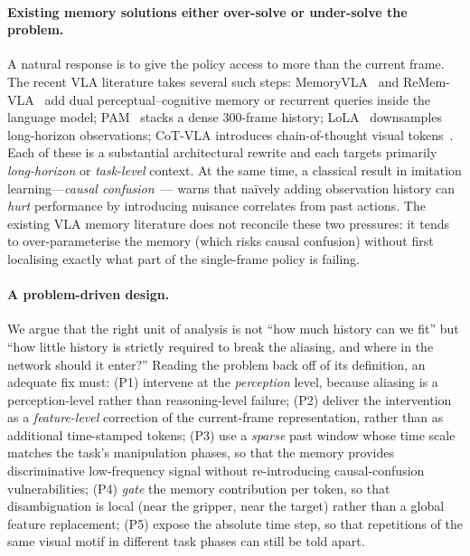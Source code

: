 \documentclass[11pt]{article}
\begin{document}
\paragraph{Existing memory solutions either over-solve or under-solve the problem.}
A natural response is to give the policy access to more than the current frame.
The recent VLA literature takes several such steps: MemoryVLA~\cite{shi2025memoryvla}
and ReMem-VLA~\cite{remem2025} add dual perceptual--cognitive memory or recurrent
queries inside the language model; PAM~\cite{pam2025} stacks a dense 300-frame
history; LoLA~\cite{lola2025} downsamples long-horizon observations; CoT-VLA
introduces chain-of-thought visual tokens~\cite{zhao2025cotvla}. Each of these is
a substantial architectural rewrite and each targets primarily
\emph{long-horizon} or \emph{task-level} context. At the same time, a classical
result in imitation learning---\emph{causal confusion}~\cite{dehaan2019causal}---
warns that na\"ively adding observation history can \emph{hurt} performance by
introducing nuisance correlates from past actions. The existing VLA memory
literature does not reconcile these two pressures: it tends to over-parameterise
the memory (which risks causal confusion) without first localising exactly what
part of the single-frame policy is failing.

\paragraph{A problem-driven design.}
We argue that the right unit of analysis is not ``how much history can we fit''
but ``how little history is strictly required to break the aliasing, and where in
the network should it enter?'' Reading the problem back off of its definition, an
adequate fix must: (P1) intervene at the \emph{perception} level, because aliasing
is a perception-level rather than reasoning-level failure; (P2) deliver the
intervention as a \emph{feature-level} correction of the current-frame
representation, rather than as additional time-stamped tokens; (P3) use a
\emph{sparse} past window whose time scale matches the task's manipulation phases,
so that the memory provides discriminative low-frequency signal without
re-introducing causal-confusion vulnerabilities; (P4) \emph{gate} the memory
contribution per token, so that disambiguation is local (near the gripper, near
the target) rather than a global feature replacement; (P5) expose the absolute
time step, so that repetitions of the same visual motif in different task phases
can still be told apart.
\end{document}
